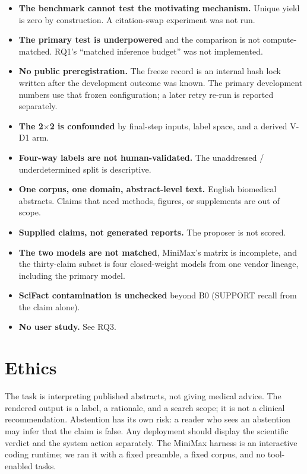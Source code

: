 \documentclass[11pt,a4paper]{article}
\begin{document}
\begin{itemize}
  \item \textbf{The benchmark cannot test the motivating mechanism.}
    Unique yield is zero by construction. A citation-swap experiment was
    not run.
  \item \textbf{The primary test is underpowered} and the comparison is
    not compute-matched. RQ1's ``matched inference budget'' was not
    implemented.
  \item \textbf{No public preregistration.} The freeze record is an
    internal hash lock written after the development outcome was known.
    The primary development numbers use that frozen configuration; a
    later retry re-run is reported separately.
  \item \textbf{The 2$\times$2 is confounded} by final-step inputs,
    label space, and a derived V-D1 arm.
  \item \textbf{Four-way labels are not human-validated.} The
    unaddressed / underdetermined split is descriptive.
  \item \textbf{One corpus, one domain, abstract-level text.} English
    biomedical abstracts. Claims that need methods, figures, or
    supplements are out of scope.
  \item \textbf{Supplied claims, not generated reports.} The proposer
    is not scored.
  \item \textbf{The two models are not matched}, MiniMax's matrix is
    incomplete, and the thirty-claim subset is four closed-weight
    models from one vendor lineage, including the primary model.
  \item \textbf{SciFact contamination is unchecked} beyond B0
    (SUPPORT recall \lunadevBZerosupportRecall{} from the claim alone).
  \item \textbf{No user study.} See RQ3.
\end{itemize}

\section{Ethics}

The task is interpreting published abstracts, not giving medical
advice. The rendered output is a label, a rationale, and a search
scope; it is not a clinical recommendation. Abstention has its own
risk: a reader who sees an abstention may infer that the claim is
false. Any deployment should display the scientific verdict and the
system action separately. The MiniMax harness is an interactive coding
runtime; we ran it with a fixed preamble, a fixed corpus, and no
tool-enabled tasks.
\end{document}
